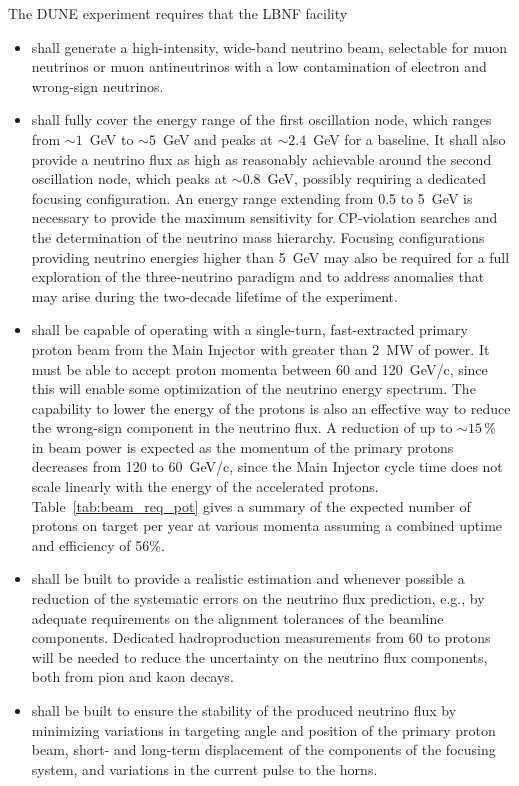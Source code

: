 The DUNE experiment requires that the LBNF facility
\begin{itemize} 
\item shall generate a high-intensity, wide-band neutrino beam,
  selectable for muon neutrinos or muon antineutrinos with a low
  contamination of electron and wrong-sign neutrinos.
  
\item shall fully cover the energy range of the first oscillation
  node, which ranges from $\sim1$~GeV to $\sim5$~GeV and peaks at
  $\sim2.4$~GeV for a  baseline. It shall also provide a
  neutrino flux as high as reasonably achievable around the second
  oscillation node, which peaks at $\sim0.8$~GeV, possibly requiring
  a dedicated focusing configuration. An energy range extending
  from 0.5 to 5~GeV is necessary to provide the maximum sensitivity
  for CP-violation searches and the determination of the neutrino mass
  hierarchy. Focusing configurations providing neutrino energies
  higher than 5~GeV may also be required for a full exploration of the
  three-neutrino paradigm and to address anomalies that may arise
  during the two-decade lifetime of the experiment. 
  
\item shall be capable of operating with a single-turn, fast-extracted
  primary proton beam from the Main Injector with greater than 2~MW of
  power. It must be able to accept proton momenta between 60 and 120~GeV/c, 
  since this will enable some optimization of the neutrino
  energy spectrum. The capability to lower the energy of the protons
  is also an effective way to reduce the wrong-sign component in the
  neutrino flux. A reduction of up to $\sim15\,\%$ in beam power is
  expected as the momentum of the primary protons decreases from 120
  to 60~GeV/c, since the Main Injector cycle time does not scale
  linearly with the energy of the accelerated protons.
  Table~\ref{tab:beam_req_pot} gives a summary of the expected number
  of protons on target per year at various momenta assuming a combined
  uptime and efficiency of 56\%.
  
\item shall be built to provide a realistic estimation and whenever
  possible a reduction of the systematic errors on the neutrino flux
  prediction, e.g., by adequate requirements on the alignment
  tolerances of the beamline components. Dedicated hadroproduction
  measurements from 60 to  %
  protons will be needed to reduce the
  uncertainty on the neutrino flux components, both from pion and kaon
  decays.
  
\item shall be built to ensure the stability of the produced neutrino
  flux by minimizing variations in targeting angle and position of the
  primary proton beam, short- and long-term displacement of the
  components of the focusing system, and variations in the current
  pulse to the horns.
\end{itemize}


